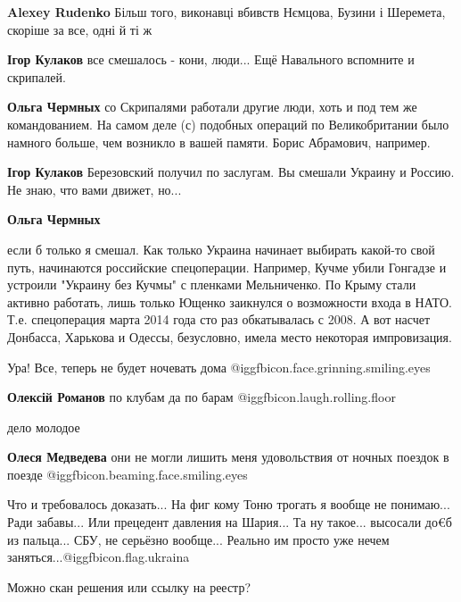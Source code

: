\begin{itemize}
\begin{itemize}
\textbf{Alexey Rudenko} Більш того, виконавці вбивств Нємцова, Бузини і Шеремета, скоріше за все, одні й ті ж

\textbf{Ігор Кулаков} все смешалось - кони, люди... Ещё Навального вспомните и скрипалей.

\textbf{Ольга Чермных} со Скрипалями работали другие люди, хоть и под тем же командованием. На самом деле (с) подобных операций по Великобритании было намного больше, чем возникло в вашей памяти. Борис Абрамович, например.

\textbf{Ігор Кулаков} Березовский получил по заслугам. Вы смешали Украину и Россию. Не знаю, что вами движет, но...

\textbf{Ольга Чермных} 

если б только я смешал. Как только Украина начинает выбирать какой-то свой
путь, начинаются российские спецоперации. Например, Кучме убили Гонгадзе и
устроили "Украину без Кучмы" с пленками Мельниченко. По Крыму стали активно
работать, лишь только Ющенко заикнулся о возможности входа в НАТО. Т.е.
спецоперация марта 2014 года сто раз обкатывалась с 2008. А вот насчет
Донбасса, Харькова и Одессы, безусловно, имела место некоторая импровизация.

\end{itemize} %

Ура! Все, теперь не будет ночевать дома  @igg{fbicon.face.grinning.smiling.eyes} 

\begin{itemize} %
\textbf{Олексій Романов} по клубам да по барам  @igg{fbicon.laugh.rolling.floor} 

дело молодое

\textbf{Олеся Медведева} они не могли лишить меня удовольствия от ночных поездок в поезде  @igg{fbicon.beaming.face.smiling.eyes} 
\end{itemize} %


Что и требовалось доказать... На фиг кому Тоню трогать я вообще не понимаю...
Ради забавы... Или прецедент давления на Шария... Та ну такое... высосали до€б
из пальца... СБУ, не серьёзно вообще... Реально им просто уже нечем
заняться...@igg{fbicon.flag.ukraina}

Можно скан решения или ссылку на реестр?


\end{itemize}
